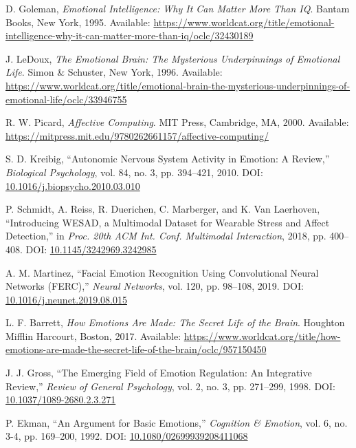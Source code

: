 \documentclass[11pt,letterpaper]{article}
\begin{document}
\begin{thebibliography}{99}

D. Goleman,
\textit{Emotional Intelligence: Why It Can Matter More Than IQ}.
Bantam Books, New York, 1995.
Available: \url{https://www.worldcat.org/title/emotional-intelligence-why-it-can-matter-more-than-iq/oclc/32430189}

J. LeDoux,
\textit{The Emotional Brain: The Mysterious Underpinnings of Emotional Life}.
Simon \& Schuster, New York, 1996.
Available: \url{https://www.worldcat.org/title/emotional-brain-the-mysterious-underpinnings-of-emotional-life/oclc/33946755}

R. W. Picard,
\textit{Affective Computing}.
MIT Press, Cambridge, MA, 2000.
Available: \url{https://mitpress.mit.edu/9780262661157/affective-computing/}

S. D. Kreibig,
``Autonomic Nervous System Activity in Emotion: A Review,''
\textit{Biological Psychology}, vol. 84, no. 3, pp. 394--421, 2010.
DOI: \href{https://doi.org/10.1016/j.biopsycho.2010.03.010}{10.1016/j.biopsycho.2010.03.010}

P. Schmidt, A. Reiss, R. Duerichen, C. Marberger, and K. Van Laerhoven,
``Introducing WESAD, a Multimodal Dataset for Wearable Stress and Affect Detection,''
in \textit{Proc. 20th ACM Int. Conf. Multimodal Interaction}, 2018, pp. 400--408.
DOI: \href{https://doi.org/10.1145/3242969.3242985}{10.1145/3242969.3242985}

A. M. Martinez,
``Facial Emotion Recognition Using Convolutional Neural Networks (FERC),''
\textit{Neural Networks}, vol. 120, pp. 98--108, 2019.
DOI: \href{https://doi.org/10.1016/j.neunet.2019.08.015}{10.1016/j.neunet.2019.08.015}

L. F. Barrett,
\textit{How Emotions Are Made: The Secret Life of the Brain}.
Houghton Mifflin Harcourt, Boston, 2017.
Available: \url{https://www.worldcat.org/title/how-emotions-are-made-the-secret-life-of-the-brain/oclc/957150450}

J. J. Gross,
``The Emerging Field of Emotion Regulation: An Integrative Review,''
\textit{Review of General Psychology}, vol. 2, no. 3, pp. 271--299, 1998.
DOI: \href{https://doi.org/10.1037/1089-2680.2.3.271}{10.1037/1089-2680.2.3.271}

P. Ekman,
``An Argument for Basic Emotions,''
\textit{Cognition \& Emotion}, vol. 6, no. 3-4, pp. 169--200, 1992.
DOI: \href{https://doi.org/10.1080/02699939208411068}{10.1080/02699939208411068}


\end{thebibliography}
\end{document}
